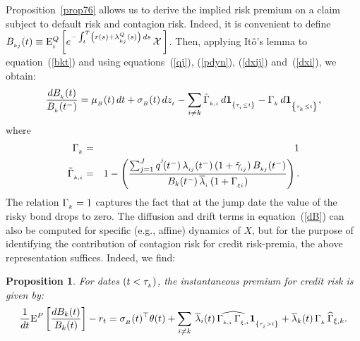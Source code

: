 \documentclass[titlepage,11pt]{article}
\def\bq{\begin{equation}}
\def\eq{\end{equation}}
\def\by{\begin{eqnarray}}
\def\ey{\end{eqnarray}}
\newtheorem{proposition}{Proposition}
\begin{document}
\vspace*{2mm} \noindent Proposition~\ref{prop76} allows us to derive
the implied risk premium on a claim subject to default risk and
contagion risk. Indeed, it is convenient to define $B_{_{{kj}}}(t)
\equiv {\rm E}^{Q}_{_{{t}}}\left[e^{-\int_t^T
\left(r(s)+\lambda_{_{{kj}}}^{Q}(s)\right) \, ds} \,{\cal  X} \,
\right]$.
Then, applying It\^o's lemma to equation~(\ref{bkt}) and using
equations~(\ref{qj}), (\ref{pdyn}), (\ref{dxij}) and~(\ref{dxi}), we
obtain: \bq\label{dB} \frac{dB\sub{k}(t)}{B\sub{k}(t^-)} =
\mu\sub{B}(t) \, dt+\sigma\sub{B}(t) \,dz\sub{t} - \sum_{i\neq k }
\tilde{\Gamma}\sub{k,i} \, d\ind{\tau\sub{i}\leq t} - \Gamma\sub{k}
\, d\ind{\tau\sub{k} \leq t}, \eq where \by
\Gamma\sub{k}&=&1\\
%
\tilde{\Gamma}\sub{k,i}&=& 1 - \left( \frac{\sum_{j=1}^J \qj(\tm) \,
\lij(\tm) \, (1+\tilde{\gamma}\sub{ij}) \, B\sub{kj}(\tm)}{B_k(\tm)
\, \overline{\lambda}\sub{i} \, (1+\Gamma\sub{\xi i})} \right). \ey
The relation $\Gamma_{_{{k}}} = 1$ captures the fact that at the jump
date the value of the risky bond drops to zero.
%
The diffusion and drift terms in equation~(\ref{dB}) can also be
computed for specific (e.g., affine) dynamics of $X$, but for the
purpose of identifying the contribution of contagion risk for credit
risk-premia, the above representation suffices. Indeed, we find:
\begin{proposition}\label{RP}
For dates $(t < \tau_{_{{k}}})$, the instantaneous premium for credit
risk is given by: \bq
\frac{1}{dt}\E^P\left[\frac{dB_k(t)}{B_k(t)}\right]-r_t=\sigma\sub{B}(t)^\top
\theta(t) +\sum_{i\neq k} \, \lb_i(t) \, \widehat {\Gamma\sub{k,i}
\, \Gamma\sub{\xi,i}}
 \ind{\tau\sub{i} > t}  + \lb_k(t) \, \Gamma\sub{k} \, \HG_{\xi,k}.
\eq
\end{proposition}
\end{document}
